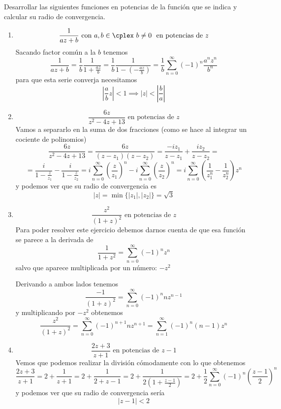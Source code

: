 \documentclass{apuntes}
\begin{document}
\begin{example}
Desarrollar las siguientes funciones en potencias de la función que se indica y calcular su radio de convergencia.
\begin{enumerate}
\item
\[\frac{1}{az+b} \text{ con } a,b \in \cplex \ b \neq 0 \ \text{ en potencias de } z\]
Sacando factor común a la $b$ tenemos
\[\frac{1}{az+b} =  \frac{1}{b} \frac{1}{1+\frac{az}{b}} = \frac{1}{b}\frac{1}{1-\left(-\frac{az}{b}\right)} = \frac{1}{b}\sum_{n=0}^{\infty}(-1)^n\frac{a^nz^n}{b^n}\]
para que esta serie converja necesitamos
\[\left| \frac{a}{b}z\right| < 1 \implies |z| < \left| \frac{b}{a} \right|\]

\item
\[\frac{6z}{z^2-4z+13} \text{ en potencias de } z\]
Vamos a separarlo en la suma de dos fracciones (como se hace al integrar un cociente de polinomios)
\[\frac{6z}{z^2-4z+13} = \frac{6z}{(z-z_1)(z-z_2)} = \frac{-iz_1}{z-z_1} + \frac{iz_2}{z-z_2} = \]
\[= \frac{i}{1-\frac{z}{z_1}} - \frac{i}{1-\frac{z}{z_2}} = i\sum_{n=0}^{\infty}\left(\frac{z}{z_1}\right)^n - i\sum_{n=0}^{\infty}\left(\frac{z}{z_2}\right)^n = i\sum_{n=0}^{\infty}\left( \frac{1}{z_1^n}-\frac{1}{z_2^n}\right)z^n\]
y podemos ver que su radio de convergencia es
\[|z| = \min \{|z_1|, |z_2|\}= \sqrt{3}\]

\item
\[\frac{z^2}{(1+z)^2} \text{ en potencias de } z\]
Para poder resolver este ejercicio debemos darnos cuenta de que esa función se parece a la derivada de
\[\frac{1}{1+z^2} = \sum_{n=0}^{\infty}(-1)^n z^n\]
salvo que aparece multiplicada por un número: $-z^2$

Derivando a ambos lados tenemos
\[\frac{-1}{(1+z)^2}=\sum_{n=0}^{\infty}(-1)^nnz^{n-1}\]
y multiplicando por $-z^2$ obtenemos
\[\frac{z^2}{(1+z)^2} = \sum_{n=0}^{\infty}(-1)^{n+1}nz^{n+1} = \sum_{n=1}^{\infty}(-1)^n(n-1)z^{n}\]

\item
\[\frac{2z+3}{z+1} \text{ en potencias de } z-1\]
Vemos que podemos realizar la división cómodamente con lo que obtenemos
\[\frac{2z+3}{z+1}=2+\frac{1}{z+1} = 2 + \frac{1}{2+z-1} = 2 + \frac{1}{2\left( 1+\frac{z-1}{2}\right)} = 2+\frac{1}{2}\sum_{n=0}^{\infty}(-1)^n\left(\frac{z-1}{2} \right)^n\]
y podemos ver que su radio de convergencia sería
\[|z-1| < 2\]

\end{enumerate}
\end{example}
\end{document}
